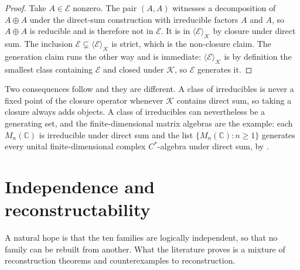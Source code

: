\documentclass[11pt,letterpaper]{article}
\theoremstyle{definition}
\theoremstyle{remark}
\begin{document}
\begin{proof}
Take $A \in \mathcal{E}$ nonzero. The pair $(A, A)$ witnesses a decomposition of $A \oplus A$ under the direct-sum construction with irreducible factors $A$ and $A$, so $A \oplus A$ is reducible and is therefore not in $\mathcal{E}$. It is in $\langle \mathcal{E} \rangle_{\mathcal{K}}$ by closure under direct sum. The inclusion $\mathcal{E} \subsetneq \langle \mathcal{E} \rangle_{\mathcal{K}}$ is strict, which is the non-closure claim. The generation claim runs the other way and is immediate: $\langle \mathcal{E} \rangle_{\mathcal{K}}$ is by definition the smallest class containing $\mathcal{E}$ and closed under $\mathcal{K}$, so $\mathcal{E}$ generates it.
\end{proof}

Two consequences follow and they are different. A class of irreducibles is never a fixed point of the closure operator whenever $\mathcal{K}$ contains direct sum, so taking a closure always adds objects. A class of irreducibles can nevertheless be a generating set, and the finite-dimensional matrix algebras are the example: each $M_n(\mathbb{C})$ is irreducible under direct sum and the list $\{M_n(\mathbb{C}) : n \geq 1\}$ generates every unital finite-dimensional complex $C^*$-algebra under direct sum, by .

\section{Independence and reconstructability}
\label{sec:independence}

A natural hope is that the ten families are logically independent, so that no family can be rebuilt from another. What the literature proves is a mixture of reconstruction theorems and counterexamples to reconstruction.
\end{document}

